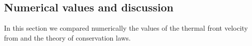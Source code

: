\subsection{Numerical values and discussion}
In this section we compared numerically the values of the thermal front velocity from \cite{Waj05} and the theory of conservation laws. 
%
%
%


